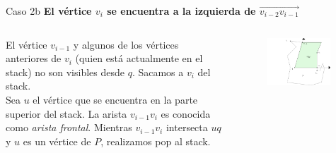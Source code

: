 \documentclass[aspectratio=169,xcolor=dvipsnames, t]{beamer}
\begin{document}
\begin{frame}{Caso 2b}
    \textbf{El vértice $v_{i}$ se encuentra a la izquierda de $\overrightarrow{v_{i-2}v_{i-1}}$}\\
    \vspace{0.5cm}
    \begin{columns}
    \begin{column}{0.45\textwidth}
    \small
        El vértice $v_{i-1}$ y algunos de los vértices anteriores de $v_{i}$ (quien está actualmente en el stack) no son visibles desde $q$. Sacamos a $v_{i}$ del stack. \\
        \vspace{0.5cm}
        Sea $u$ el vértice que se encuentra en la parte superior del stack. La arista $v_{i-1}v_{i}$ es conocida como \textit{arista frontal}. Mientras $v_{i-1}v_{i}$ intersecta $uq$ y $u$ es un vértice de $P$, realizamos pop al stack.\\
    \end{column}
    \begin{column}{0.45\textwidth}  %
    \vspace{-1.5cm}
        \begin{figure}
            \centering
            \includegraphics[width=0.95\textwidth]{imagenes/Caso2.4a.png}
        \end{figure}
    \end{column}
    \end{columns}
\end{frame}

\end{document}
